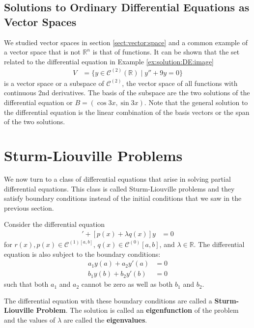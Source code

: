 \subsection{Solutions to Ordinary Differential Equations as Vector Spaces}

We studied vector spaces in section \ref{sect:vector:space} and a common example of a vector space that is not $\mathbb{R}^n$ is that of functions.  It can be shown that the set related to the differential equation in Example \ref{ex:solution:DE:image}
%
\begin{align*}
V & = \{ y \in \mathcal{C}^{(2)}(\mathbb{R}) \; | \; y'' + 9 y = 0 \}
\end{align*}
is a vector space or a subspace of $\mathcal{C}^{(2)}$, the vector space of all functions with continuous 2nd derivatives.  The basis of the subspace are the two solutions of the differential equation or $B=(\cos 3x, \sin 3x)$.  Note that the general solution to the differential equation is the linear combination of the basis vectors or the span of the two solutions.



\section{Sturm-Liouville Problems }  \label{sect:sturm:liouville}

We now turn to a class of differential equations that arise in solving partial differential equations.  This class is called Sturm-Liouville problems and they satisfy boundary conditions instead of the initial conditions that we saw in the previous section.

\begin{definition}
Consider the differential equation
%
\begin{align*}
[r(x) y']' + [p(x) + \lambda q(x)] y & = 0
\end{align*}
for $r(x), p(x) \in \mathcal{C}^{(1)[a,b]}$, $q(x)\in \mathcal{C}^{(0)}[a,b]$, and $\lambda \in \mathbb{R}$.  The differential equation is also subject to the boundary conditions:
\begin{align*}
a_1 y(a) + a_2 y'(a) & = 0 \\
b_1 y(b) + b_2 y'(b) & = 0
\end{align*}
such that both $a_1$ and $a_2$ cannot be zero as well as both $b_1$ and $b_2$.

The differential equation with these boundary conditions are called a \textbf{Sturm-Liouville Problem}.  The solution is called an \textbf{eigenfunction} of the problem and the values of $\lambda$ are called the \textbf{eigenvalues}.

\end{definition}

